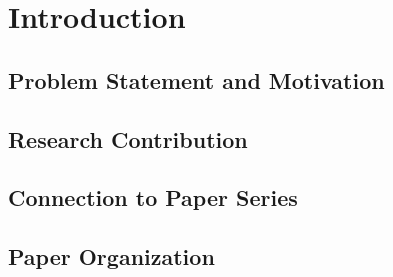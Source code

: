 
\section{Introduction}

\subsection{Problem Statement and Motivation}

\subsection{Research Contribution}

\subsection{Connection to Paper Series}

\subsection{Paper Organization}
